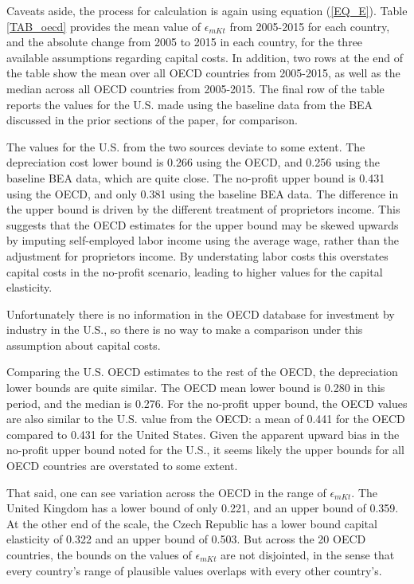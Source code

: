 \documentclass[11pt]{article}
\begin{document}
Caveats aside, the process for calculation is again using equation (\ref{EQ_E}). Table \ref{TAB_oecd} provides the mean value of $\epsilon_{mKt}$ from 2005-2015 for each country, and the absolute change from 2005 to 2015 in each country, for the three available assumptions regarding capital costs. In addition, two rows at the end of the table show the mean over all OECD countries from 2005-2015, as well as the median across all OECD countries from 2005-2015. The final row of the table reports the values for the U.S. made using the baseline data from the BEA discussed in the prior sections of the paper, for comparison.

The values for the U.S. from the two sources deviate to some extent. The depreciation cost lower bound is 0.266 using the OECD, and 0.256 using the baseline BEA data, which are quite close. The no-profit upper bound is 0.431 using the OECD, and only 0.381 using the baseline BEA data. The difference in the upper bound is driven by the different treatment of proprietors income. This suggests that the OECD estimates for the upper bound may be skewed upwards by imputing self-employed labor income using the average wage, rather than the \cite{gommerupert2004} adjustment for proprietors income. By understating labor costs this overstates capital costs in the no-profit scenario, leading to higher values for the capital elasticity.

Unfortunately there is no information in the OECD database for investment by industry in the U.S., so there is no way to make a comparison under this assumption about capital costs.

Comparing the U.S. OECD estimates to the rest of the OECD, the depreciation lower bounds are quite similar. The OECD mean lower bound is 0.280 in this period, and the median is 0.276. For the no-profit upper bound, the OECD values are also similar to the U.S. value from the OECD: a mean of 0.441 for the OECD compared to 0.431 for the United States. Given the apparent upward bias in the no-profit upper bound noted for the U.S., it seems likely the upper bounds for all OECD countries are overstated to some extent.  

That said, one can see variation across the OECD in the range of $\epsilon_{mKt}$. The United Kingdom has a lower bound of only 0.221, and an upper bound of 0.359. At the other end of the scale, the Czech Republic has a lower bound capital elasticity of 0.322 and an upper bound of 0.503. But across the 20 OECD countries, the bounds on the values of $\epsilon_{mKt}$ are not disjointed, in the sense that every country's range of plausible values overlaps with every other country's.
\end{document}
